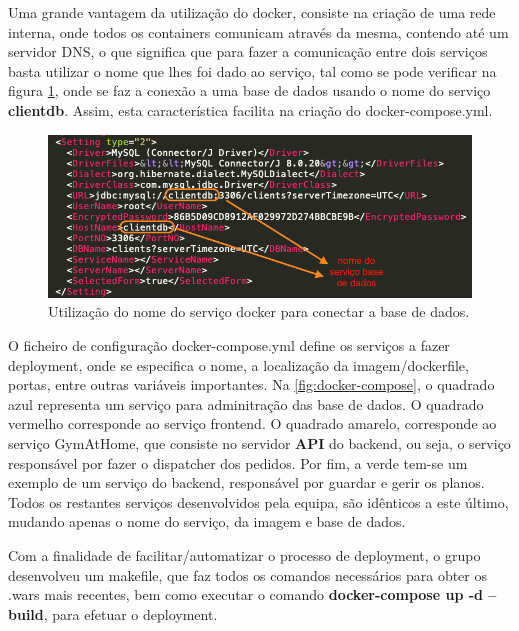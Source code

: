 \hspace{5mm} Uma grande vantagem da utilização do docker, consiste na criação de uma rede interna, onde todos os containers comunicam através da mesma, contendo até um servidor DNS, o que significa que para fazer a comunicação entre dois serviços basta utilizar o nome que lhes foi dado ao serviço, tal como se pode verificar na figura \ref{fig:dns-docker}, onde se faz a conexão a uma base de dados usando o nome do serviço \textbf{clientdb}. Assim, esta característica facilita na criação do docker-compose.yml.

\begin{figure}[H]
    \centering
    \includegraphics[scale=0.30]{images/deployment/dns-docker.png}
    \caption{Utilização do nome do serviço docker para conectar a base de dados.}
    \label{fig:dns-docker}
\end{figure}

\hspace{5mm} O ficheiro de configuração docker-compose.yml define os serviços a fazer deployment, onde se especifica o nome, a localização da imagem/dockerfile, portas, entre outras variáveis importantes. Na \ref{fig:docker-compose}, o quadrado azul representa um serviço para adminitração das base de dados. O quadrado vermelho corresponde ao serviço frontend. O quadrado amarelo, corresponde ao serviço GymAtHome, que consiste no servidor \textbf{API} do backend, ou seja, o serviço responsável por fazer o dispatcher dos pedidos. Por fim, a verde tem-se um exemplo de um serviço do backend, responsável por guardar e gerir os planos. Todos os restantes serviços desenvolvidos pela equipa, são idênticos a este último, mudando apenas o nome do serviço, da imagem e  base de dados.

\hspace{5mm} Com a finalidade de facilitar/automatizar o processo de deployment, o grupo desenvolveu um makefile, que faz todos os comandos necessários para obter os .wars mais recentes, bem como executar o comando \textbf{docker-compose up -d --build}, para efetuar o deployment.

